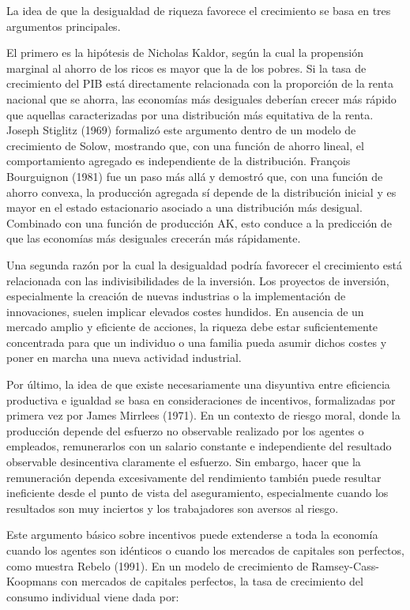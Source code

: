 \documentclass[10pt,a4paper]{article}
\begin{document}
La idea de que la desigualdad de riqueza favorece el crecimiento se basa en tres argumentos principales.

El primero es la hipótesis de Nicholas Kaldor, según la cual la propensión marginal al ahorro de los ricos es mayor que la de los pobres. Si la tasa de crecimiento del PIB está directamente relacionada con la proporción de la renta nacional que se ahorra, las economías más desiguales deberían crecer más rápido que aquellas caracterizadas por una distribución más equitativa de la renta. Joseph Stiglitz (1969) formalizó este argumento dentro de un modelo de crecimiento de Solow, mostrando que, con una función de ahorro lineal, el comportamiento agregado es independiente de la distribución. François Bourguignon (1981) fue un paso más allá y demostró que, con una función de ahorro convexa, la producción agregada sí depende de la distribución inicial y es mayor en el estado estacionario asociado a una distribución más desigual. Combinado con una función de producción AK, esto conduce a la predicción de que las economías más desiguales crecerán más rápidamente.

Una segunda razón por la cual la desigualdad podría favorecer el crecimiento está relacionada con las indivisibilidades de la inversión. Los proyectos de inversión, especialmente la creación de nuevas industrias o la implementación de innovaciones, suelen implicar elevados costes hundidos. En ausencia de un mercado amplio y eficiente de acciones, la riqueza debe estar suficientemente concentrada para que un individuo o una familia pueda asumir dichos costes y poner en marcha una nueva actividad industrial.

Por último, la idea de que existe necesariamente una disyuntiva entre eficiencia productiva e igualdad se basa en consideraciones de incentivos, formalizadas por primera vez por James Mirrlees (1971). En un contexto de riesgo moral, donde la producción depende del esfuerzo no observable realizado por los agentes o empleados, remunerarlos con un salario constante e independiente del resultado observable desincentiva claramente el esfuerzo. Sin embargo, hacer que la remuneración dependa excesivamente del rendimiento también puede resultar ineficiente desde el punto de vista del aseguramiento, especialmente cuando los resultados son muy inciertos y los trabajadores son aversos al riesgo.

Este argumento básico sobre incentivos puede extenderse a toda la economía cuando los agentes son idénticos o cuando los mercados de capitales son perfectos, como muestra Rebelo (1991). En un modelo de crecimiento de Ramsey-Cass-Koopmans con mercados de capitales perfectos, la tasa de crecimiento del consumo individual viene dada por:
\end{document}
